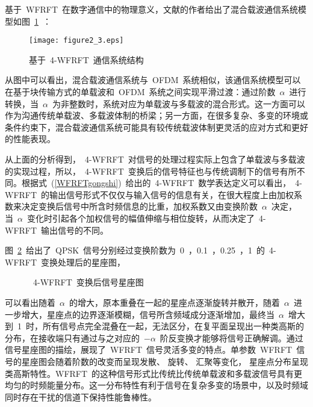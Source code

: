 基于~WFRFT~在数字通信中的物理意义，文献\cite{mei2017_38_44}的作者给出了混合载波通信系统模型如图~\ref{xitongjiegou}~：
\begin{figure}[htbp]
\centering
\texttt{[image: figure2\_3.eps]}
\caption{基于~4-WFRFT~通信系统结构}\vspace{-1em}\label{xitongjiegou}
\end{figure}

从图中可以看出，混合载波通信系统与~OFDM~系统相似，该通信系统模型可以在基于块传输方式的单载波和~OFDM~系统之间实现平滑过渡：通过阶数~$\alpha$~进行转换，当~$\alpha$~为非整数时，系统对应为单载波与多载波的混合形式。这一方面可以作为沟通传统单载波、多载波体制的桥梁；另一方面，在很多复杂、多变的环境或条件约束下，混合载波通信系统可能具有较传统载波体制更灵活的应对方式和更好的性能表现。

从上面的分析得到，~4-WFRFT~对信号的处理过程实际上包含了单载波与多载波的实现过程，所以，~4-WFRFT~变换后的信号特征也与传统调制下的信号有所不同。根据式~(\ref{WFRFTgongshi})~给出的~4-WFRFT~数学表达定义可以看出，~4-WFRFT~的输出信号形式不仅仅与输入信号的信息有关，在很大程度上由加权系数来决定变换后信号中所含时频信息的比重，加权系数又由变换阶数~$\alpha$~决定，当~$\alpha$~变化时引起各个加权信号的幅值伸缩与相位旋转，从而决定了~4-WFRFT~输出信号的不同。

图~\ref{xingzuotu}~给出了~QPSK~信号分别经过变换阶数为~0~，0.1~，0.25~，1~的~4-WFRFT~变换处理后的星座图，
\begin{figure}[htbp]
\centering
\subfigure{\label{xingzuo1}}\addtocounter{subfigure}{-2}
\subfigure{\label{xingzuo2}}\addtocounter{subfigure}{-2}
\subfigure{\label{xingzuo3}}\addtocounter{subfigure}{-2}
\subfigure{\label{xingzuo4}}\addtocounter{subfigure}{-2}
\caption{~4-WFRFT~变换后信号星座图}\label{xingzuotu}\vspace{-1em}
\end{figure}
可以看出随着~$\alpha$~的增大，原本重叠在一起的星座点逐渐旋转并散开，随着~$\alpha$~进一步增大，星座点的边界逐渐模糊，信号所含频域成分逐渐增加，最终当~$\alpha$~增大到~1~时，所有信号点完全混叠在一起，无法区分，在复平面呈现出一种类高斯的分布，在接收端只有通过与之对应的~$-\alpha$~阶反变换才能够将信号正确解调。通过信号星座图的描绘，展现了~WFRFT~信号灵活多变的特点。单参数~WFRFT~信号的星座图会随着阶数的改变而呈现发散、 旋转、 汇聚等变化， 星座点分布呈现类高斯特性。WFRFT~的这种信号形式比传统比传统单载波和多载波信号具有更均匀的时频能量分布。这一分布特性有利于信号在复杂多变的场景中，以及时频域同时存在干扰的信道下保持性能鲁棒性。

